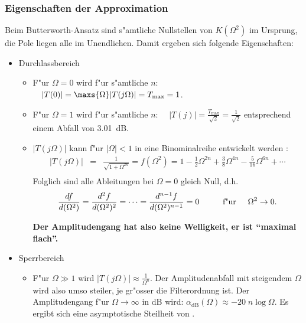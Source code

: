 \subsubsection{Eigenschaften der Approximation }
{\bf{}}  Beim Butterworth-Ansatz sind
s"amtliche Nullstellen von $K(\Omega^{2})$ im Ursprung, die Pole liegen alle im Unendlichen. Damit ergeben sich folgende Eigenschaften:\\
\begin{itemize}
\item Durchlassbereich
\begin{itemize}
\item F"ur $\Omega=0$ wird f"ur s"amtliche $n$: $\quad |T(0)|=\maxs{\Omega}|T(j\Omega)|=T_{\max}=1$.
    
\item F"ur $\Omega=1$ wird f"ur s"amtliche $n$: $\quad |T(j)|=\frac{T_{\max}}{\sqrt{2}}=\frac{1}{\sqrt{2}}$ entsprechend einem Abfall von 3.01~dB.
\item $|T(j\Omega)|$ kann f"ur $|\Omega|<1$ in eine Binominalreihe entwickelt werden \cite{BRO:SEM:91}:
      \begin{eqnarray*}
      |T(j\Omega)|&=&\frac{1}{\sqrt{1+\Omega^{2n}}}=f(\Omega^{2})=1-\frac{1}{2}\Omega^{2n}+\frac{3}{8}\Omega^{4n}-\frac{5}{16}
      \Omega^{6n}+\cdots\\       
      \end{eqnarray*}
      Folglich sind alle Ableitungen bei $\Omega=0$ gleich Null, d.h.
      \[
      \frac{df}{d(\Omega^{2})}=\frac{d^{2}f}{d(\Omega^{2})^{2}}=\cdots
     =\frac{d^{n-1}f} {d(\Omega^{2})^{n-1}}=0 \hspace{1cm} \mbox{f"ur}
      \hspace{.5cm} \Omega^{2} \rightarrow 0.
      \]
      
      {\bf Der Amplitudengang hat also keine
        Welligkeit, er ist ``maximal flach''.}
\end{itemize}

\item Sperrbereich
\begin{itemize}
\item F"ur $\Omega\gg1$ wird $|T(j\Omega)|\approx \frac{1}{\Omega^{n}}$. Der Amplitudenabfall mit steigendem $\Omega$ wird also umso
      steiler, je gr"osser die Filterordnung ist.  Der Amplitudengang
      f"ur $\Omega \rightarrow \infty$ in dB wird:
      $\alpha_{\text{dB}}(\Omega) \approx - 20 \; n \log{\Omega}$. Es
      ergibt sich eine asymptotische Steilheit von  .


\end{itemize}
\end{itemize}
